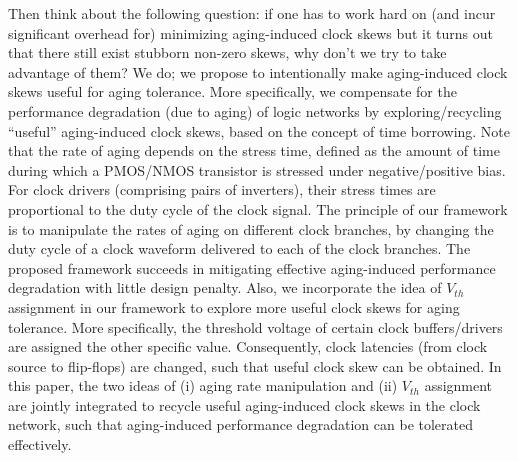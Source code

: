 Then think about the following question: if one has to work hard on (and incur significant overhead for) minimizing aging-induced clock skews but it turns out that there still exist stubborn non-zero skews, why don't we try to take advantage of them? We do; we propose to intentionally make aging-induced clock skews useful for aging tolerance. More specifically, we compensate for the performance degradation (due to aging) of logic networks by exploring/recycling \enquote{useful} aging-induced clock skews, based on the concept of time borrowing. Note that the rate of aging depends on the stress time, defined as the amount of time during which a PMOS/NMOS transistor is stressed under negative/positive bias. For clock drivers (comprising pairs of inverters), their stress times are proportional to the duty cycle of the clock signal. The principle of our framework is to manipulate the rates of aging on different clock branches, by changing the duty cycle of a clock waveform delivered to each of the clock branches. The proposed framework succeeds in mitigating effective aging-induced performance degradation with little design penalty.
Also, we incorporate the idea of $V_{th}$ assignment in our framework to explore more useful clock skews for aging tolerance. More specifically, the threshold voltage of certain clock buffers/drivers are assigned the other specific value. Consequently, clock latencies (from clock source to flip-flops) are changed, such that useful clock skew can be obtained. In this paper, the two ideas of (i) aging rate manipulation and (ii) $V_{th}$ assignment are jointly integrated to recycle useful aging-induced clock skews in the clock network, such that aging-induced performance degradation can be tolerated effectively.
